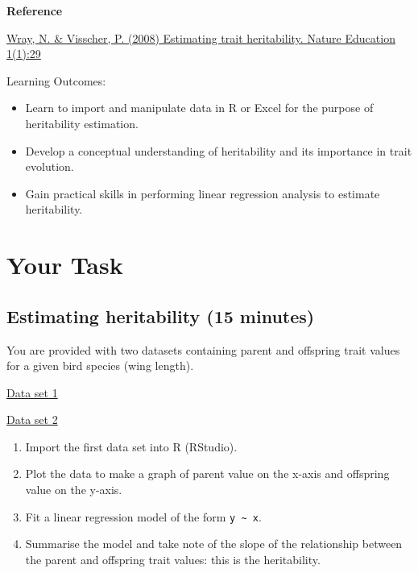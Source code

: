 \documentclass[
  a4paper]{book}
\providecommand{\tightlist}{%
  \setlength{\itemsep}{0pt}\setlength{\parskip}{0pt}}
\begin{document}
\textbf{Reference}

\href{https://www.nature.com/scitable/topicpage/estimating-trait-heritability-46889/}{Wray, N. \& Visscher, P. (2008) Estimating trait heritability. Nature Education 1(1):29}

\begin{do-something}
Learning Outcomes:

\begin{itemize}
\tightlist
\item
  Learn to import and manipulate data in R or Excel for the purpose of
  heritability estimation.
\item
  Develop a conceptual understanding of heritability and its importance
  in trait evolution.
\item
  Gain practical skills in performing linear regression analysis to
  estimate heritability.
\end{itemize}
\end{do-something}

\section{Your Task}\label{your-task-13}

\subsection{Estimating heritability (15 minutes)}\label{estimating-heritability-15-minutes}

You are provided with two datasets containing parent and offspring trait values for a given bird species (wing length).

\href{https://www.dropbox.com/scl/fi/8oe1can46pshxojw1p29m/heritability_pop1.csv?rlkey=ssg6ymzr85gkrzw9e1y63ghzu&dl=0}{Data set 1}

\href{https://www.dropbox.com/scl/fi/yoy0x7kczvlr1eku5057m/heritability_pop2.csv?rlkey=30hta1di8v6w93ghbhq09dlbm&dl=0}{Data set 2}

\begin{enumerate}
\def\labelenumi{\arabic{enumi})}
\tightlist
\item
  Import the first data set into R (RStudio).
\item
  Plot the data to make a graph of parent value on the x-axis and offspring value on the y-axis.
\item
  Fit a linear regression model of the form \texttt{y\ \textasciitilde{}\ x}.
\item
  Summarise the model and take note of the slope of the relationship between the parent and offspring trait values: this is the heritability.
\end{enumerate}
\end{document}
